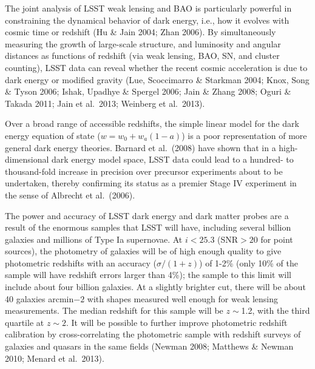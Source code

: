The joint analysis of LSST weak lensing and BAO is
particularly powerful in constraining the dynamical behavior of dark
energy, i.e., how it evolves with cosmic time or redshift (Hu \& Jain
2004; Zhan 2006).  By
simultaneously measuring the growth of large-scale structure, and
luminosity and angular distances as functions of redshift (via weak
lensing, BAO, SN, and cluster counting), LSST data can reveal whether
the recent cosmic acceleration is due to dark energy or modified
gravity (Lue, Scoccimarro \& Starkman 2004; Knox, Song \& Tyson 2006;
Ishak, Upadhye \& Spergel 2006; Jain \& Zhang 2008; Oguri \& Takada
2011; Jain et al.~2013; Weinberg et al.~2013).

Over a broad range of accessible redshifts, the simple linear model
for the dark energy equation of state ($w = w_0 + w_a(1-a)$) is a poor representation of more
general dark energy theories. Barnard et al.~(2008) have shown that in a high-dimensional dark energy model space, 
LSST data could lead to a hundred- to thousand-fold increase in precision over 
precursor experiments about to be undertaken, thereby confirming its status as 
a premier Stage IV experiment in the sense of Albrecht et al.~(2006). 

The power and accuracy of LSST dark energy and dark matter probes are
a result of the enormous samples that LSST will have, including 
several billion galaxies and millions of Type Ia
supernovae. At $i < 25.3$ (SNR${}>20$ for point sources), the
photometry of galaxies will be of high enough quality to give
photometric redshifts with an accuracy ($\sigma/(1+z)$) of 1-2\% (only
10\% of the sample will have redshift errors larger than 4\%); the
sample to this limit will include about four billion galaxies.  At a
slightly brighter cut, there will be about 40 galaxies arcmin${-2}$
with shapes measured well enough for weak lensing measurements.  
The median redshift for 
this sample will be $z\sim$1.2, with the third quartile at $z\sim2$. 
It will be possible to further improve photometric redshift calibration
by cross-correlating the photometric sample with redshift surveys of
galaxies and quasars in the same fields (Newman 2008; Matthews \&
Newman 2010; Menard et al.~2013).  


